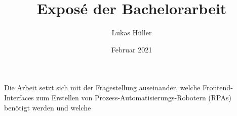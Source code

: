 \documentclass[a4paper, twoside, ngerman]{article}
\title{Exposé der Bachelorarbeit}
\author{Lukas Hüller}
\date{Februar 2021}
\begin{document}
\maketitle

Die Arbeit setzt sich mit der Fragestellung auseinander, welche Frontend-Interfaces zum Erstellen von Prozess-Automatisierungs-Robotern (RPAs) benötigt werden und welche
\end{document}
